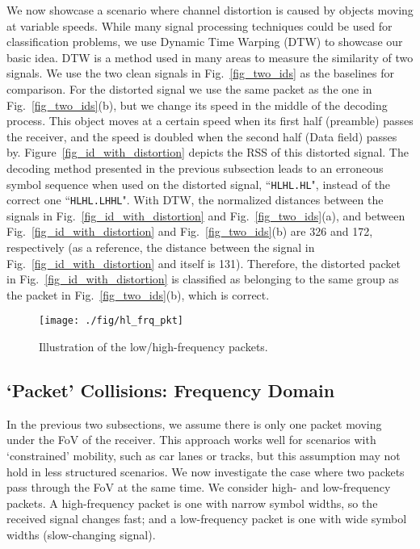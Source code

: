 \documentclass[10pt]{sig-alternate-05-2015}
\begin{document}
We now showcase a scenario where channel distortion is caused by objects moving at variable speeds. While many signal processing techniques could be used for classification problems, we use Dynamic Time Warping (DTW) to showcase our basic idea. DTW is a method used in many areas to measure the similarity of two signals. We use the two clean signals in Fig.~\ref{fig_two_ids} as the baselines for comparison. For the distorted signal we use the same packet as the one in Fig.~\ref{fig_two_ids}(b), but we change its speed in the middle of the decoding process. This object moves at a certain speed when its first half (preamble) passes the receiver, and the speed is doubled when the second half (Data field) passes by. Figure~\ref{fig_id_with_distortion} depicts the RSS of this distorted signal. The decoding method presented in the previous subsection leads to an erroneous symbol sequence when used on the distorted signal, ``\texttt{HLHL.HL}", instead of the correct one ``\texttt{HLHL.LHHL}". With DTW, the normalized distances between the signals in Fig.~\ref{fig_id_with_distortion} and Fig.~\ref{fig_two_ids}(a), and between Fig.~\ref{fig_id_with_distortion} and Fig.~\ref{fig_two_ids}(b) are  326 and 172, respectively (as a reference, the distance between the signal in Fig.~\ref{fig_id_with_distortion} and itself is 131). Therefore, the distorted packet in Fig.~\ref{fig_id_with_distortion} is classified as belonging to the same group as the packet in Fig.~\ref{fig_two_ids}(b), which is correct.

\begin{figure}[!b]
	\centering
	\vspace{-2mm}
	\texttt{[image: ./fig/hl\_frq\_pkt]}
	\vspace{-2mm}
	\caption {Illustration of the low/high-frequency packets.}
	\vspace{-1mm}
	\label{fig_hl_frq_pkt}
\end{figure}

\subsection{`Packet' Collisions: Frequency Domain}
In the previous two subsections, we assume there is only one packet moving under the FoV of the receiver. This approach works well for scenarios with `constrained' mobility, such as car lanes or tracks, but this assumption may not hold in less structured scenarios.
We now investigate the case where two packets pass through the FoV at the same time. We consider high- and low-frequency packets. A high-frequency packet is one with narrow symbol widths, so the received signal changes fast; and a low-frequency packet is one with wide symbol widths (slow-changing signal). 
\end{document}
